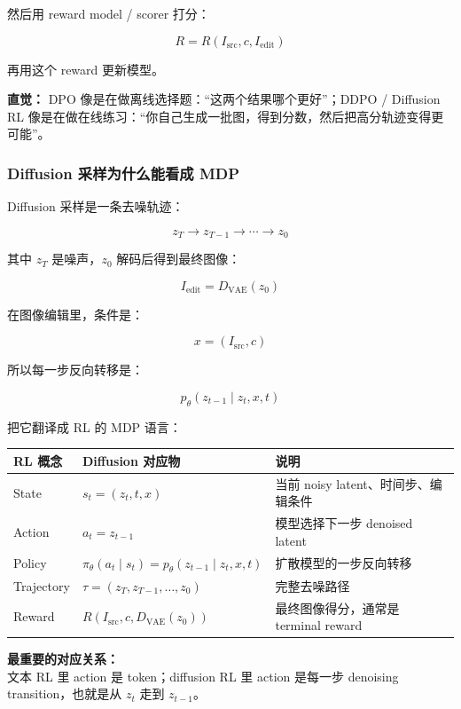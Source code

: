 然后用 reward model / scorer 打分：

\[
R
=
R(I_\text{src},c,I_\text{edit})
\]

再用这个 reward 更新模型。

\begin{intubox}
\textbf{直觉：} DPO 像是在做离线选择题：“这两个结果哪个更好”；DDPO / Diffusion RL 像是在做在线练习：“你自己生成一批图，得到分数，然后把高分轨迹变得更可能”。
\end{intubox}

\subsubsection{Diffusion 采样为什么能看成 MDP}

Diffusion 采样是一条去噪轨迹：

\[
z_T
\to
z_{T-1}
\to
\cdots
\to
z_0
\]

其中 $z_T$ 是噪声，$z_0$ 解码后得到最终图像：

\[
I_\text{edit}
=
D_\text{VAE}(z_0)
\]

在图像编辑里，条件是：

\[
x=(I_\text{src},c)
\]

所以每一步反向转移是：

\[
p_\theta(z_{t-1}\mid z_t,x,t)
\]

把它翻译成 RL 的 MDP 语言：

\begin{center}
{\small
\begin{tabular}{p{3cm}p{4.6cm}p{5cm}}
\hline
\textbf{RL 概念} & \textbf{Diffusion 对应物} & \textbf{说明} \\
\hline
State
&
$s_t=(z_t,t,x)$
&
当前 noisy latent、时间步、编辑条件
\\
Action
&
$a_t=z_{t-1}$
&
模型选择下一步 denoised latent
\\
Policy
&
$\pi_\theta(a_t\mid s_t)=p_\theta(z_{t-1}\mid z_t,x,t)$
&
扩散模型的一步反向转移
\\
Trajectory
&
$\tau=(z_T,z_{T-1},\ldots,z_0)$
&
完整去噪路径
\\
Reward
&
$R(I_\text{src},c,D_\text{VAE}(z_0))$
&
最终图像得分，通常是 terminal reward
\\
\hline
\end{tabular}
}
\end{center}

\begin{summarybox}
\textbf{最重要的对应关系：}\\
文本 RL 里 action 是 token；diffusion RL 里 action 是每一步 denoising transition，也就是从 $z_t$ 走到 $z_{t-1}$。
\end{summarybox}

